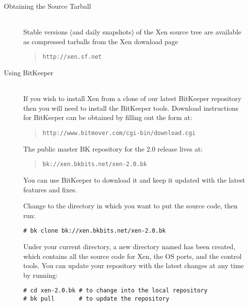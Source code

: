 \begin{description}
\item[Obtaining the Source Tarball]\mbox{} \\
  Stable versions (and daily snapshots) of the Xen source tree are
  available as compressed tarballs from the Xen download page
  \begin{quote} {\tt http://xen.sf.net}
  \end{quote}

\item[Using BitKeeper]\mbox{} \\
  If you wish to install Xen from a clone of our latest BitKeeper
  repository then you will need to install the BitKeeper tools.
  Download instructions for BitKeeper can be obtained by filling out
  the form at:
  \begin{quote} {\tt http://www.bitmover.com/cgi-bin/download.cgi}
\end{quote}
The public master BK repository for the 2.0 release lives at:
\begin{quote} {\tt bk://xen.bkbits.net/xen-2.0.bk}
\end{quote} 
You can use BitKeeper to download it and keep it updated with the
latest features and fixes.

Change to the directory in which you want to put the source code, then
run:
\begin{verbatim}
# bk clone bk://xen.bkbits.net/xen-2.0.bk
\end{verbatim}

Under your current directory, a new directory named 
has been created, which contains all the source code for Xen, the OS
ports, and the control tools. You can update your repository with the
latest changes at any time by running:
\begin{verbatim}
# cd xen-2.0.bk # to change into the local repository
# bk pull       # to update the repository
\end{verbatim}
\end{description}

%
%

